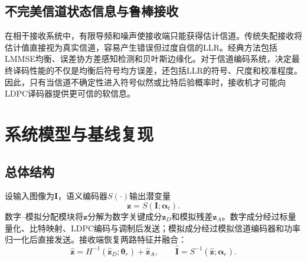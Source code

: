 \documentclass[UTF8,a4paper,11pt]{ctexart}
\newcommand{\LLR}{LLR}
\newcommand{\LDPC}{LDPC}
\begin{document}
\subsection{不完美信道状态信息与鲁棒接收}
在相干接收系统中，有限导频和噪声使接收端只能获得估计信道。传统失配接收将估计值直接视为真实信道，容易产生错误但过度自信的\LLR{}。经典方法包括LMMSE均衡、误差协方差感知检测和贝叶斯边缘化\cite{kay1993estimation,proakis2007digital}。对于信道编码系统，决定最终译码性能的不仅是均衡后符号均方误差，还包括\LLR{}的符号、尺度和校准程度。因此，只有当信道不确定性进入符号似然或比特后验概率时，接收机才可能向\LDPC{}译码器提供更可信的软信息。

\section{系统模型与基线复现}
\subsection{总体结构}
设输入图像为$\bm I$，语义编码器$S(\cdot)$输出潜变量
\begin{equation}
  \bm z=S(\bm I;\bm\alpha_t).
  \label{eq:semantic_encoder}
\end{equation}
数字--模拟分配模块将$\bm z$分解为数字关键成分$\bm z_D$和模拟残差$\bm z_A$。数字成分经过标量量化、比特映射、\LDPC{}编码与调制后发送；模拟成分经过模拟信道编码器和功率归一化后直接发送。接收端恢复两路特征并融合：
\begin{equation}
  \hat{\bm z}=H^{-1}(\hat{\bm z}_D;\bm\theta_r)+\hat{\bm z}_A,
  \qquad
  \hat{\bm I}=S^{-1}(\hat{\bm z};\bm\alpha_r).
  \label{eq:hda_fusion}
\end{equation}
\end{document}
